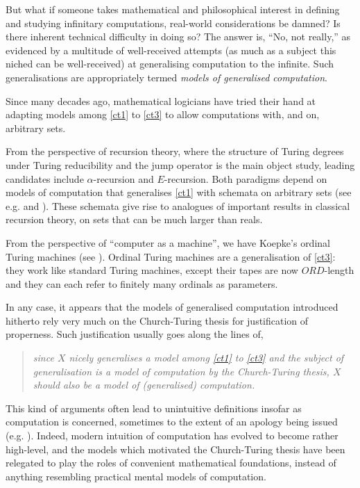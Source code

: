 \documentclass[12pt]{article}
\numberwithin{equation}{section}
\begin{document}
But what if someone takes mathematical and philosophical interest in defining and studying infinitary computations, real-world considerations be damned? Is there inherent technical difficulty in doing so? The answer is, ``No, not really,'' as evidenced by a multitude of well-received attempts (as much as a subject this niched can be well-received) at generalising computation to the infinite. Such generalisations are appropriately termed \textit{models of generalised computation}.

Since many decades ago, mathematical logicians have tried their hand at adapting models among \ref{ct1} to \ref{ct3} to allow computations with, and on, arbitrary sets.

From the perspective of recursion theory, where the structure of Turing degrees under Turing reducibility and the jump operator is the main object study, leading candidates include $\alpha$-recursion and $E$-recursion. Both paradigms depend on models of computation that generalises \ref{ct1} with schemata on arbitrary sets (see e.g. \cite{takeuti} and \cite{normann}). These schemata give rise to analogues of important results in classical recursion theory, on sets that can be much larger than reals. 

From the perspective of ``computer as a machine'', we have Koepke's ordinal Turing machines (see \cite{koepke1}). Ordinal Turing machines are a generalisation of \ref{ct3}: they work like standard Turing machines, except their tapes are now $ORD$-length and they can each refer to finitely many ordinals as parameters. 

In any case, it appears that the models of generalised computation introduced hitherto rely very much on the Church-Turing thesis for justification of properness. Such justification usually goes along the lines of,
\begin{quote}
    \emph{since $X$ nicely generalises a model among \ref{ct1} to \ref{ct3} and the subject of generalisation is a model of computation by the Church-Turing thesis, $X$ should also be a model of (generalised) computation.}
\end{quote}
This kind of arguments often lead to unintuitive definitions insofar as computation is concerned, sometimes to the extent of an apology being issued (e.g. \cite{sackserec}). Indeed, modern intuition of computation has evolved to become rather high-level, and the models which motivated the Church-Turing thesis have been relegated to play the roles of convenient mathematical foundations, instead of anything resembling practical mental models of computation.
\end{document}
